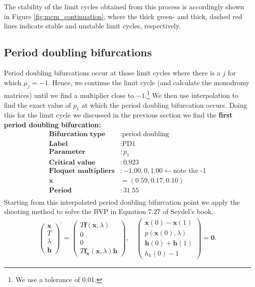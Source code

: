 The stability of the limit cycles obtained from this process is accordingly shown in Figure \ref{fig:mcm_continuation}, where 
the thick green- and thick, dashed red lines indicate stable and unstable limit cycles, respectively. 

\subsection{Period doubling bifurcations}
Period doubling bifurcations occur at those limit cycles where there is a $j$ for which $\mu_j = -1$.
Hence, we continue the limit cycle (and calculate the monodromy matrices) until we find a multiplier close to $-1$.\footnote{We use a tolerance of 0.01.}
We then use interpolation to find the exact value of $p_1$ at which the period doubling bifurcation occurs.
Doing this for the limit cycle we discussed in the previous section we find the
\textbf{first period doubling bifurcation: } 
\begin{align*}
    \textbf{Bifurcation type} & : \text{period doubling} \\
    \textbf{Label} &: \text{PD1} \\
    \textbf{Parameter} & : p_1 \\
    \textbf{Critical value} & : 0.923 \\
    \textbf{Floquet multipliers} & : -1.00, 0, 1.00 \leftarrow \text{note the -1} \\
    \mathbf{x}  & = (0.59, 0.17, 0.10) \\
    \textbf{Period} & : 31.55 \\
\end{align*}
Starting from this interpolated period doubling bifurcation point we 
apply the shooting method to solve the BVP in Equation 7.27 of Seydel's book. 
\begin{align}
    \left(\begin{array}{c}
        \mathbf{x} \\
        T \\
        \lambda \\
        \mathbf{h}
        \end{array}\right)^{\prime}=\left(\begin{array}{c}
        T \mathbf{f}(\mathbf{x}, \lambda) \\
        0 \\
        0 \\
        T \mathbf{f}_{\mathbf{x}}(\mathbf{x}, \lambda) \mathbf{h}
        \end{array}\right), \quad\left(\begin{array}{c}
        \mathbf{x}(0)-\mathbf{x}(1) \\
        p(\mathbf{x}(0), \lambda) \\
        \mathbf{h}(0)+\mathbf{h}(1) \\
        h_k(0)-1
        \end{array}\right)=\mathbf{0} .
\end{align}
